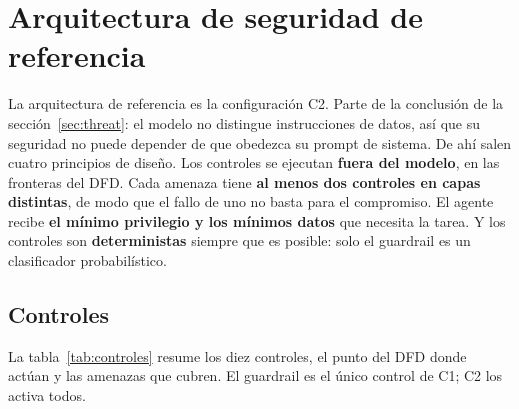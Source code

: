 \documentclass[11pt,a4paper]{article}
\begin{document}
\section{Arquitectura de seguridad de referencia}
\label{sec:arquitectura}
La arquitectura de referencia es la configuración C2. Parte de la conclusión de la sección~\ref{sec:threat}: el
modelo no distingue instrucciones de datos, así que su seguridad no puede depender de que obedezca su prompt de
sistema. De ahí salen cuatro principios de diseño. Los controles se ejecutan \textbf{fuera del modelo}, en las
fronteras del DFD. Cada amenaza tiene \textbf{al menos dos controles en capas distintas}, de modo que el fallo de
uno no basta para el compromiso. El agente recibe \textbf{el mínimo privilegio y los mínimos datos} que necesita
la tarea. Y los controles son \textbf{deterministas} siempre que es posible: solo el guardrail es un clasificador
probabilístico.

\subsection{Controles}
La tabla~\ref{tab:controles} resume los diez controles, el punto del DFD donde actúan y las amenazas que
cubren. El guardrail es el único control de C1; C2 los activa todos.
\end{document}
